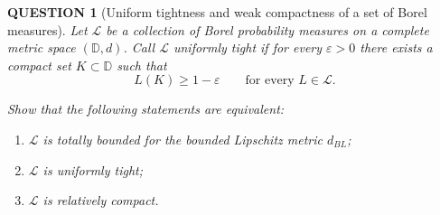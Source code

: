 \documentclass[12pt]{article}
\renewcommand{\(}{\left(}%
\renewcommand{\)}{\right)}%
\renewcommand{\[}{\left[}%
\renewcommand{\]}{\right]}%
\newtheorem{question}{QUESTION}[section]}
\begin{document}
\begin{question}[Uniform tightness and weak compactness of a set of Borel measures]

Let $\mathscr L$ be a collection of Borel probability measures on a complete metric space $(\mathbb D,d)$. 
Call $\mathscr L$ \emph{uniformly tight} if for every $\varepsilon>0$ there exists a compact set $K\subset\mathbb D$ such that
\begin{equation*}
L(K)\ge 1-\varepsilon \qquad \text{for every } L\in\mathscr L.
\end{equation*}

Show that the following statements are equivalent:

\begin{enumerate}
\item[(i)] $\mathscr L$ is totally bounded for the bounded Lipschitz metric $d_{BL}$;
\item[(ii)] $\mathscr L$ is uniformly tight;
\item[(iii)] $\mathscr L$ is relatively compact.
\end{enumerate}
\end{question}
\end{document}
